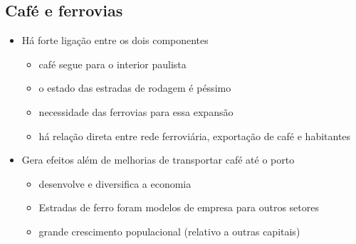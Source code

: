 \documentclass[a4paper,12pt]{article}[abntex2]
\begin{document}
\subsection{\textbf{Café e ferrovias}}
\begin{itemize}
    \item Há forte ligação entre os dois componentes
    \begin{itemize}
        \item  café segue para o interior paulista
    \end{itemize}
    \begin{itemize}
        \item o estado das estradas de rodagem é péssimo
    \end{itemize}
    \begin{itemize}
        \item necessidade das ferrovias para essa expansão
    \end{itemize}
    \begin{itemize}
        \item há relação direta entre rede ferroviária, exportação de café e habitantes
    \end{itemize}
    \item Gera efeitos além de melhorias de transportar café até o porto
    \begin{itemize}
        \item desenvolve e diversifica a economia
    \end{itemize}
    \begin{itemize}
        \item  Estradas de ferro foram modelos de empresa para outros setores
    \end{itemize}
    \begin{itemize}
        \item grande crescimento populacional (relativo a outras capitais)
    \end{itemize}
\end{itemize}
\end{document}
